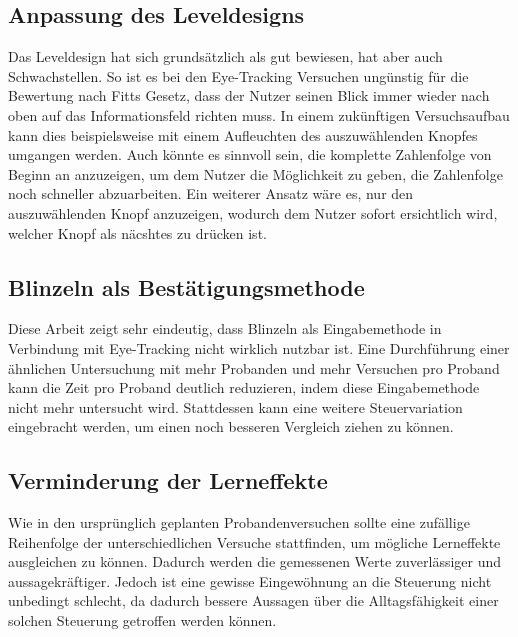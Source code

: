\subsection{Anpassung des Leveldesigns}
Das Leveldesign hat sich grundsätzlich als gut bewiesen, hat aber auch Schwachstellen. So ist es bei den Eye-Tracking Versuchen ungünstig für die Bewertung nach Fitts Gesetz, dass der Nutzer seinen Blick immer wieder nach oben auf das Informationsfeld richten muss. In einem zukünftigen Versuchsaufbau kann dies beispielsweise mit einem Aufleuchten des auszuwählenden Knopfes umgangen werden. Auch könnte es sinnvoll sein, die komplette Zahlenfolge von Beginn an anzuzeigen, um dem Nutzer die Möglichkeit zu geben, die Zahlenfolge noch schneller abzuarbeiten. Ein weiterer Ansatz wäre es, nur den auszuwählenden Knopf anzuzeigen, wodurch dem Nutzer sofort ersichtlich wird, welcher Knopf als näcshtes zu drücken ist.

\subsection{Blinzeln als Bestätigungsmethode}
Diese Arbeit zeigt sehr eindeutig, dass Blinzeln als Eingabemethode in Verbindung mit Eye-Tracking nicht wirklich nutzbar ist. Eine Durchführung einer ähnlichen Untersuchung mit mehr Probanden und mehr Versuchen pro Proband kann die Zeit pro Proband deutlich reduzieren, indem diese Eingabemethode nicht mehr untersucht wird. Stattdessen kann eine weitere Steuervariation eingebracht werden, um einen noch besseren Vergleich ziehen zu können. 

\subsection{Verminderung der Lerneffekte}
Wie in den ursprünglich geplanten Probandenversuchen sollte eine zufällige Reihenfolge der unterschiedlichen Versuche stattfinden, um mögliche Lerneffekte ausgleichen zu können. Dadurch werden die gemessenen Werte zuverlässiger und aussagekräftiger. Jedoch ist eine gewisse Eingewöhnung an die Steuerung nicht unbedingt schlecht, da dadurch bessere Aussagen über die Alltagsfähigkeit einer solchen Steuerung getroffen werden können. 
